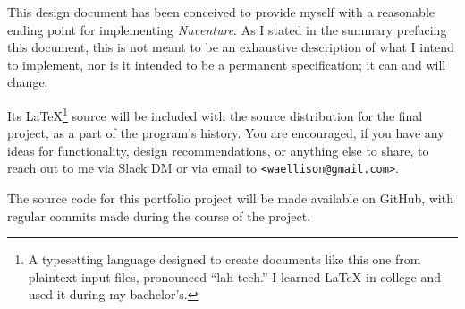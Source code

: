 \documentclass[11pt,letterpaper]{article}
\begin{document}
This design document has been conceived to provide myself with a reasonable ending point for implementing {\it Nuventure}.  As I stated in the summary prefacing this document, this is not meant to be an exhaustive description of what I intend to implement, nor is it intended to be a permanent specification; it can and will change.

Its \LaTeX{}\footnote{A typesetting language designed to create documents like this one from plaintext input files, pronounced ``lah-tech.''  I learned \LaTeX{} in college and used it during my bachelor's.} source will be included with the source distribution for the final project, as a part of the program's history.  You are encouraged, if you have any ideas for functionality, design recommendations, or anything else to share, to reach out to me via Slack DM or via email to {\tt <waellison@gmail.com>}.

The source code for this portfolio project will be made available on GitHub, with regular commits made during the course of the project.
\end{document}
